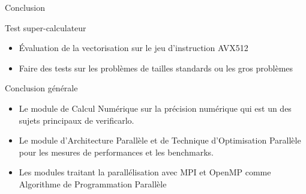\documentclass{beamer}
\begin{document}
\begin{frame}{ Conclusion}

  \begin{block}{Test super-calculateur}
    \begin{itemize}
    \item Évaluation de la vectorisation sur le jeu d'instruction AVX512
    \item Faire des tests sur les problèmes de tailles standards ou les gros problèmes
    \end{itemize}
  \end{block}
  
  \begin{block}{Conclusion générale}
    \begin{itemize}
    \item Le module de Calcul Numérique sur la précision numérique qui est un des sujets principaux de verificarlo.
    \item Le module d’Architecture Parallèle et de Technique d’Optimisation Parallèle pour les mesures de performances et les benchmarks.
    \item Les modules traitant la parallélisation avec MPI et OpenMP comme Algorithme de Programmation Parallèle 
    \end{itemize}
  \end{block}
  
\end{frame}
\end{document}
